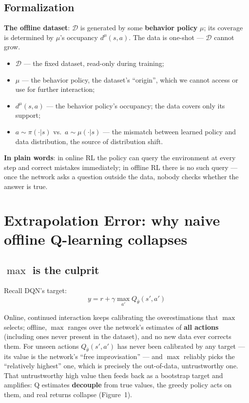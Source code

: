 \documentclass{article}
\begin{document}
\subsection*{Formalization}

\textbf{The offline dataset}: $\mathcal{D}$ is generated by some \textbf{behavior policy} $\mu$; its coverage is determined by $\mu$'s occupancy $d^\mu(s,a)$. The data is one-shot --- $\mathcal{D}$ cannot grow.

\begin{itemize}
  \item $\mathcal{D}$ --- the fixed dataset, read-only during training;
  \item $\mu$ --- the behavior policy, the dataset's ``origin'', which we cannot access or use for further interaction;
  \item $d^\mu(s,a)$ --- the behavior policy's occupancy; the data covers only its support;
  \item $a\sim\pi(\cdot|s)$ vs.\ $a\sim\mu(\cdot|s)$ --- the mismatch between learned policy and data distribution, the source of distribution shift.
\end{itemize}

\textbf{In plain words}: in online RL the policy can query the environment at every step and correct mistakes immediately; in offline RL there is no such query --- once the network asks a question outside the data, nobody checks whether the answer is true.

\section*{Extrapolation Error: why naive offline Q-learning collapses}

\subsection*{$\max$ is the culprit}

Recall DQN's target:
\[
y = r + \gamma \max_{a'} Q_{\bar\theta}(s', a')
\]

Online, continued interaction keeps calibrating the overestimations that $\max$ selects; offline, $\max$ ranges over the network's estimates of \textbf{all actions} (including ones never present in the dataset), and no new data ever corrects them. For unseen actions $Q_{\bar\theta}(s',a')$ has never been calibrated by any target --- its value is the network's ``free improvisation'' --- and $\max$ reliably picks the ``relatively highest'' one, which is precisely the out-of-data, untrustworthy one. That untrustworthy high value then feeds back as a bootstrap target and amplifies: Q estimates \textbf{decouple} from true values, the greedy policy acts on them, and real returns collapse (Figure~1).
\end{document}
